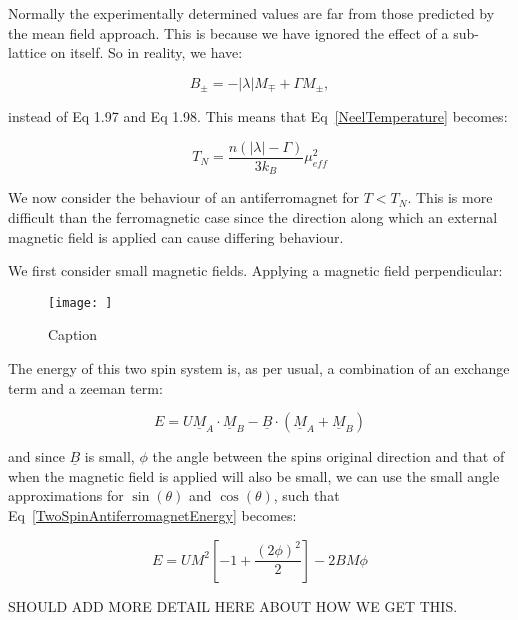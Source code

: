 \noindent Normally the experimentally determined values are far from those predicted by the mean field approach. This is because we have ignored the effect of a sub-lattice on itself. So in reality, we have:

\begin{equation}
    B_{\pm} = -|\lambda|M_{\mp} + \Gamma M_{\pm},
\end{equation}

\noindent instead of Eq 1.97 and Eq 1.98. This means that Eq~\ref{NeelTemperature} becomes:

\begin{equation}
    T_N = \frac{n(|\lambda| - \Gamma)}{3k_B} \mu_{eff}^2
    \label{ModifiedNeelTemperature}
\end{equation}

\noindent We now consider the behaviour of an antiferromagnet for $T < T_N$. This is more difficult than the ferromagnetic case since the direction along which an external magnetic field is applied can cause differing behaviour.

\noindent We first consider small magnetic fields. Applying a magnetic field perpendicular:

\begin{figure}
    \centering
    \texttt{[image: ]}
    \caption{Caption}
    \label{fig:enter-label}
\end{figure}

\noindent The energy of this two spin system is, as per usual, a combination of an exchange term and a zeeman term:

\begin{equation}
    E = U \underline{M}_A \cdot \underline{M}_B - \underline{B} \cdot (\underline{M}_A + \underline{M}_B)
    \label{TwoSpinAntiferromagnetEnergy}
\end{equation}

\noindent and since $\underline{B}$ is small, $\phi$ the angle between the spins original direction and that of when the magnetic field is applied will also be small, we can use the small angle approximations for $\sin(\theta)$ and $\cos(\theta)$, such that Eq~\ref{TwoSpinAntiferromagnetEnergy} becomes:

\begin{equation}
    E = UM^2[-1 + \frac{(2\phi)^2}{2}] - 2BM\phi
    \label{TwoSpinAntiferromagnetcEnergyApproximate}
\end{equation}

\noindent SHOULD ADD MORE DETAIL HERE ABOUT HOW WE GET THIS.

